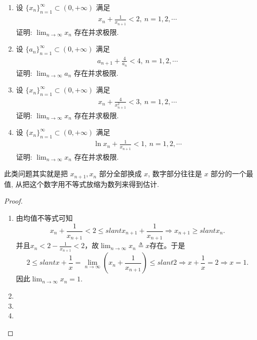 \documentclass[../../main.tex]{subfiles}
\begin{document}
\begin{example}
\begin{enumerate}
\item 设 $\{x_n\}_{n=1}^{\infty} \subset (0,+\infty)$ 满足
\begin{align*}
x_n + \frac{1}{x_{n+1}} < 2,\ n = 1,2,\cdots
\end{align*}
证明: $\lim_{n \to \infty} x_n$ 存在并求极限.
\item 设 $\{a_n\}_{n=1}^{\infty} \subset (0,+\infty)$ 满足
\begin{align*}
a_{n+1} + \frac{4}{a_n} < 4,\ n = 1,2,\cdots
\end{align*}
证明: $\lim_{n \to \infty} a_n$ 存在并求极限.
\item 设 $\{x_n\}_{n=1}^{\infty} \subset (0,+\infty)$ 满足
\begin{align*}
x_n + \frac{4}{x_{n+1}^2} < 3,\ n = 1,2,\cdots
\end{align*}
证明: $\lim_{n \to \infty} x_n$ 存在并求极限.
\item 设 $\{x_n\}_{n=1}^{\infty} \subset (0,+\infty)$ 满足
\begin{align*}
\ln x_n + \frac{1}{x_{n+1}} < 1,\ n = 1,2,\cdots
\end{align*}
证明: $\lim_{n \to \infty} x_n$ 存在并求极限.
\end{enumerate}
\end{example}
\begin{note}
此类问题其实就是把 $x_{n+1}, x_n$ 部分全部换成 $x$, 数字部分往往是 $x$ 部分的一个最值, 从把这个数字用不等式放缩为数列来得到估计.
\end{note}
\begin{proof}
\begin{enumerate}
\item 由均值不等式可知
$$x_n + \frac{1}{x_{n+1}} < 2 \leqslant slant x_{n+1} + \frac{1}{x_{n+1}} \Rightarrow x_{n+1} \geqslant slant x_n.$$
并且$x_n < 2 - \frac{1}{x_{n+1}} < 2$，故$\lim_{n \to \infty} x_n \triangleq x$存在。于是
$$2 \leqslant slant x + \frac{1}{x} = \lim_{n \to \infty} \left( x_n + \frac{1}{x_{n+1}} \right) \leqslant slant 2 \Rightarrow x + \frac{1}{x} = 2 \Rightarrow x = 1.$$
因此$\lim_{n \to \infty} x_n = 1.$

\item 

\item 

\item 
\end{enumerate}
\end{proof}
\end{document}
